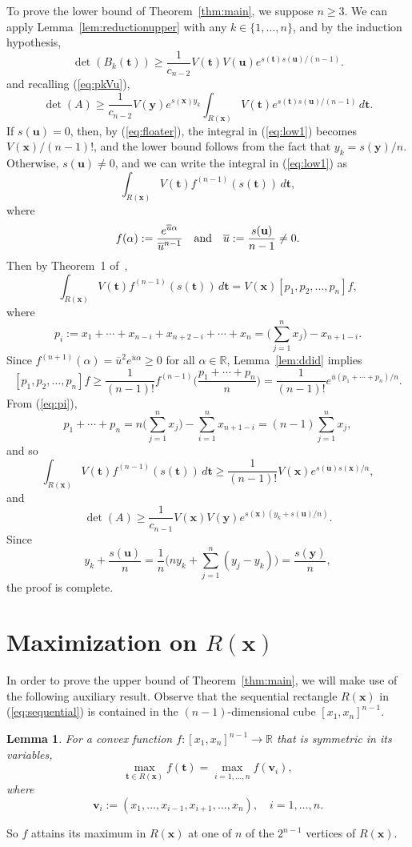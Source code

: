 \documentclass[12pt]{article}
\newcommand{\RR}{\mathbb{R}}
\def\bft{\mathbf{t}}
\def\bfu{\mathbf{u}}
\def\bfv{\mathbf{v}}
\def\bfx{\mathbf{x}}
\def\bfy{\mathbf{y}}
\def\ubar{\overline{u}}
\newtheorem{lemma}{Lemma}
\begin{document}
To prove the lower bound of Theorem~\ref{thm:main},
we suppose $n \ge 3$.
We can apply Lemma~\ref{lem:reductionupper}
with any $k \in \{1,\ldots,n\}$,
and by the induction hypothesis,
$$
 \det(B_k(\bft)) \ge 
\frac{1}{c_{n-2}}
V(\bft) V(\bfu) e^{s(\bft)s(\bfu)/(n-1)}.
$$
and recalling (\ref{eq:pkVu}),
\begin{equation}\label{eq:low1}
 \det(A) \ge \frac{1}{c_{n-2}} V(\bfy) e^{s(\bfx)y_k}
\int_{R(\bfx)} V(\bft) e^{s(\bft)s(\bfu)/(n-1)} \, d\bft.
\end{equation}
If $s(\bfu) = 0$, then, by (\ref{eq:floater}),
the integral in (\ref{eq:low1}) becomes $V(\bfx)/(n-1)!$,
and the lower bound follows from the fact that $y_k = s(\bfy)/n$.
Otherwise, $s(\bfu) \ne 0$,
and we can write the integral in (\ref{eq:low1}) as
$$ \int_{R(\bfx)} V(\bft) f^{(n-1)}(s(\bft)) \, d\bft, $$
where
$$ f(\alpha) := \frac{e^{\ubar \alpha}}{\ubar^{n-1}}
\quad \hbox{and} \quad
\ubar := \frac{s(\bfu)}{n-1} \ne 0. $$
Then by Theorem~1 of~\cite{Floater:2026a},
$$ \int_{R(\bfx)} V(\bft) f^{(n-1)}(s(\bft)) \, d\bft
= V(\bfx) [p_1,p_2,\ldots,p_n]f, $$
where
\begin{equation}\label{eq:pi}
 p_i := x_1 + \cdots + x_{n-i} + x_{n+2-i} + \cdots + x_n
      = \Big(\sum_{j=1}^n x_j \Big) - x_{n+1-i}.
\end{equation}
Since $f^{(n+1)}(\alpha) = \ubar^2 e^{\ubar \alpha} \ge 0$ for
all $\alpha \in \RR$,
Lemma~\ref{lem:ddid} implies
$$ [p_1,p_2,\ldots,p_n]f \ge
\frac{1}{(n-1)!}
f^{(n-1)}\Big(\frac{p_1 + \cdots + p_n}{n}\Big)
= \frac{1}{(n-1)!}
e^{\ubar(p_1 + \cdots + p_n)/n}. $$
From (\ref{eq:pi}),
$$ p_1 + \cdots + p_n = 
      n \Big(\sum_{j=1}^n x_j \Big) - \sum_{i=1}^n x_{n+1-i}
       = (n-1) \sum_{j=1}^n x_j, $$
and so
$$ \int_{R(\bfx)} V(\bft) f^{(n-1)}(s(\bft)) \, d\bft
 \ge \frac{1}{(n-1)!} V(\bfx) e^{s(\bfu)s(\bfx)/n}, $$
and
$$ \det(A) \ge \frac{1}{c_{n-1}} 
V(\bfx) V(\bfy) e^{s(\bfx)(y_k+s(\bfu)/n)}. $$ 
Since
$$ y_k+\frac{s(\bfu)}{n}
 = \frac{1}{n} \Big(ny_k + \sum_{j=1}^n (y_j-y_k)\Big)
   = \frac{s(\bfy)}{n}, $$
the proof is complete.

\section{Maximization on $R(\bfx)$}

In order to prove the upper bound of 
Theorem~\ref{thm:main}, we will make use of the following
auxiliary result. Observe that the sequential rectangle $R(\bfx)$
in (\ref{eq:sequential}) is contained in the $(n-1)$-dimensional
cube $[x_1,x_n]^{n-1}$.
\begin{lemma}\label{lem:axial2}
For a convex function $f:[x_1,x_n]^{n-1} \to \RR$
that is symmetric in its variables,
$$ \max_{\bft \in R(\bfx)} f(\bft)
= \max_{i=1,\ldots,n} f(\bfv_i), $$
where
\begin{equation}\label{eq:vi}
\bfv_i := (x_1,\ldots,x_{i-1},x_{i+1},\ldots,x_n), \quad i=1,\ldots,n.
\end{equation}
\end{lemma}
So $f$ attains its maximum in $R(\bfx)$ at one of $n$
of the $2^{n-1}$ vertices of $R(\bfx)$.
\end{document}
